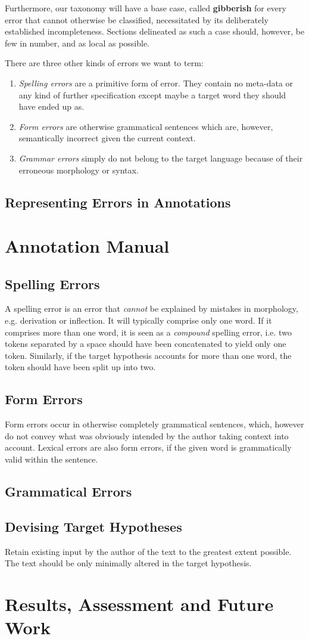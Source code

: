 \documentclass[12pt]{article}
\begin{document}
Furthermore, our taxonomy will have a base case, called \textbf{gibberish} for
every error that cannot otherwise be classified, necessitated by its
deliberately established incompleteness. Sections delineated as such a case
should, however, be few in number, and as local as possible.

There are three other kinds of errors we want to term:

\begin{enumerate}
\item \textit{Spelling errors} are a primitive form of error. They contain no
meta-data or any kind of further specification except maybe a target word they
should have ended up as.
\item \textit{Form errors} are otherwise grammatical sentences which are,
however, semantically incorrect given the current context.
\item \textit{Grammar errors} simply do not belong to the target language because
of their erroneous morphology or syntax.
\end{enumerate}

\subsection{Representing Errors in Annotations}

\section{Annotation Manual}\label{sec:manual}

\subsection{Spelling Errors}\label{sec:speling}
A spelling error is an error that \textit{cannot} be explained by mistakes in
morphology, e.g. derivation or inflection. It will typically comprise only one
word. If it comprises more than one word, it is seen as a \textit{compound}
spelling error, i.e. two tokens separated by a space should have been
concatenated to yield only one token. Similarly, if the target hypothesis
accounts for more than one word, the token should have been split up into two.

\subsection{Form Errors}
Form errors occur in otherwise completely grammatical sentences, which, however
do not convey what was obviously intended by the author taking context into
account. Lexical errors are also form errors, if the given word is grammatically
valid within the sentence.

\subsection{Grammatical Errors}

\subsection{Devising Target Hypotheses}
Retain existing input by the author of the text to the greatest extent possible.
The text should be only minimally altered in the target hypothesis.


\section{Results, Assessment and Future Work}\label{sec:results}
\end{document}
